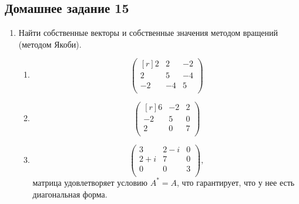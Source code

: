\subsection{Домашнее задание 15}\begin{enumerate}
    \item Найти собственные векторы и собственные значения методом вращений (методом Якоби).
    \begin{enumerate}
        \item \[\begin{pmatrix}[r]
        2 & 2 & -2\\
        2 & 5 & -4\\
        -2 & -4 & 5\\
        \end{pmatrix}\]
        \item \[\begin{pmatrix}[r]
        6 & -2 & 2\\
        -2 & 5 & 0\\
        2 & 0 & 7\\
        \end{pmatrix}\]
        \item \[\begin{pmatrix}
        3 & 2-i & 0\\
        2+i & 7 & 0\\
        0 & 0 & 3\\
        \end{pmatrix},\] матрица удовлетворяет условию $A^*=A$, что гарантирует, что у нее есть диагональная форма.
    \end{enumerate}
\end{enumerate}